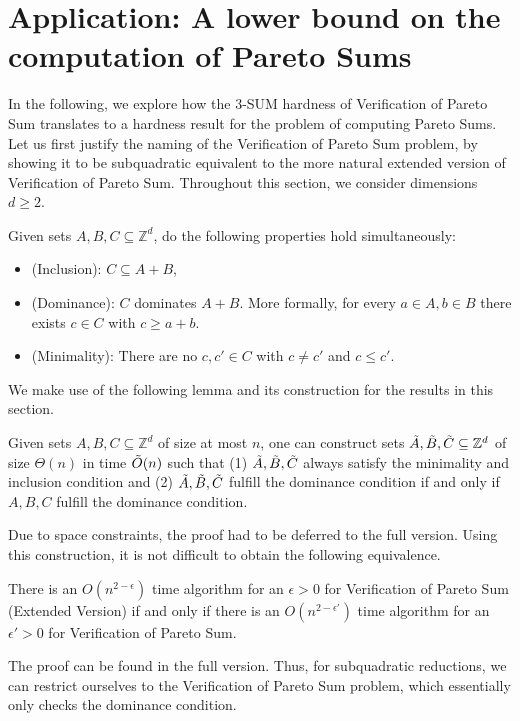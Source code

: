 \section{Application:  A lower bound on the computation of Pareto Sums} \label{sec:applications} \label{sec:ParetoSum}
In the following, we explore how the $3$-SUM hardness of Verification of Pareto Sum
translates to a hardness result for the problem of computing Pareto Sums.
Let us first justify the naming of the Verification of Pareto Sum problem,
by showing it to be subquadratic equivalent to the more natural extended version of Verification of Pareto Sum.
Throughout this section, we consider dimensions $d\ge 2$.
\begin{definition}
	Given sets $A,B,C \subseteq \mathbb{Z}^d$, do 
	the following properties hold simultaneously:
	\begin{itemize}
	\item (Inclusion): $C\subseteq A+B$,
	\item (Dominance): $C$ dominates $A+B$. More formally, for every $a \in A, b \in B$ there exists $c \in C$ with $c\geq a+b$.
	\item (Minimality): There are no $c,c' \in C$ with $c\neq c'$ and $c \leq c'$. 
	\end{itemize}
\end{definition}

We make use of the following lemma and its construction for the results in this section.

\begin{lemma}
	Given sets $A,B,C \subseteq \mathbb{Z}^d$ of size at most $n$, one can construct sets $\Tilde{A},\Tilde{B},\Tilde{C} \subseteq \mathbb{Z}^d$ of size $\Theta(n)$ 
	in time $\Tilde{O}(n)$ such that (1) $\Tilde{A}, \Tilde{B}, \Tilde{C}$ always satisfy the minimality and inclusion condition and (2)
	$\Tilde{A},\Tilde{B},\Tilde{C}$ fulfill the dominance condition if and only if $A,B,C$ fulfill 
	the dominance condition.  
	\label{annoying_construction}
	\end{lemma}
	Due to space constraints, the proof had to be deferred to the full version. Using this construction, it is not difficult to obtain the following equivalence.

	\begin{lemma}
		There is an $O(n^{2-\epsilon})$ time algorithm for an $\epsilon>0$ for Verification of Pareto Sum (Extended Version)
		if and only if there is an $O(n^{2-\epsilon'})$ time algorithm for an $\epsilon'>0$ for Verification of Pareto Sum.
		\end{lemma}
	The proof can be found in the full version.
Thus, for subquadratic reductions, we can restrict ourselves to the Verification of Pareto Sum problem, which essentially
only checks the dominance condition.


